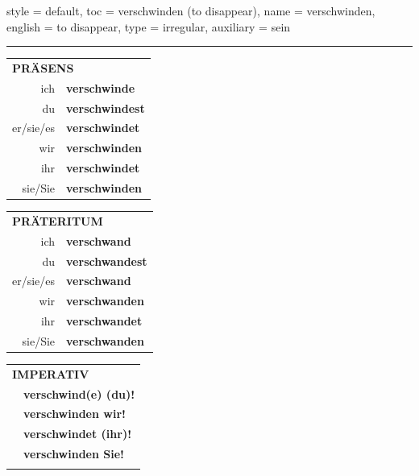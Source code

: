\begin{verbentry}{
  style = {default},
  toc = {verschwinden (to disappear)},
  name = {verschwinden},
  english = {to disappear},
  type = {irregular},
  auxiliary = {sein}
}
 
    
     \vspace{5pt}

    \hrule
    
    \vspace{5pt}

  \begin{tabular}{rl}
     \multicolumn{2}{l}{\textbf{PRÄSENS} }\\
    ich & \textbf{verschwinde}\\
    du & \textbf{verschwindest}\\
    er/sie/es & \textbf{verschwindet}\\
    wir & \textbf{verschwinden}\\
    ihr & \textbf{verschwindet}\\
    sie/Sie & \textbf{verschwinden}\\
  \end{tabular}
  \hfill
     \begin{tabular}{rl}
    \multicolumn{2}{l}{\textbf{PRÄTERITUM} }\\
    ich & \textbf{verschwand}\\
    du & \textbf{verschwandest}\\
    er/sie/es & \textbf{verschwand}\\
    wir & \textbf{verschwanden}\\
    ihr & \textbf{verschwandet}\\
    sie/Sie & \textbf{verschwanden}\\
  \end{tabular}
  \hfill
  \begin{tabular}{rl}
     \multicolumn{2}{l}{\textbf{IMPERATIV} }\\
   & \textbf{verschwind(e) (du)!}\\
   & \textbf{verschwinden wir!}\\
   & \textbf{verschwindet (ihr)!}\\
   & \textbf{verschwinden Sie!}\\
   & \vspace{10pt}
  \end{tabular}

    \vspace{10pt}


\end{verbentry}
